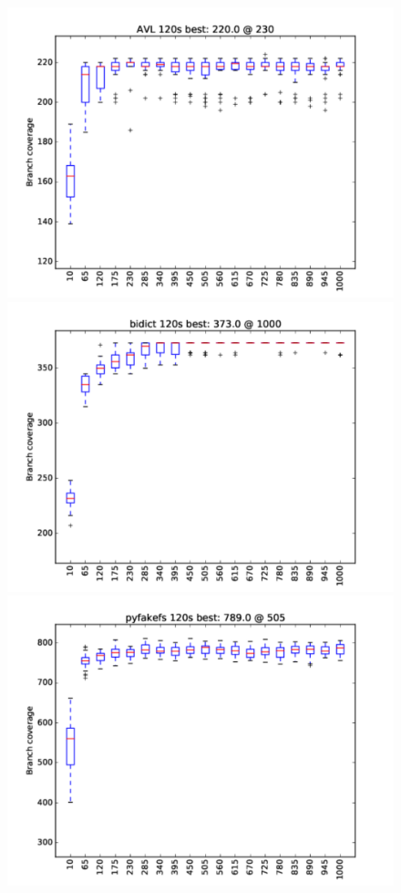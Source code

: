 \documentclass[sigplan,screen]{acmart}
\begin{document}
\begin{figure}
\vspace{2mm}
  \includegraphics[width=0.8\columnwidth]{graphs/AVLrand120}
  \includegraphics[width=0.8\columnwidth]{graphs/bidictrand120}
\includegraphics[width=0.8\columnwidth]{graphs/pyfakefsrand120}

\end{figure}
\end{document}
